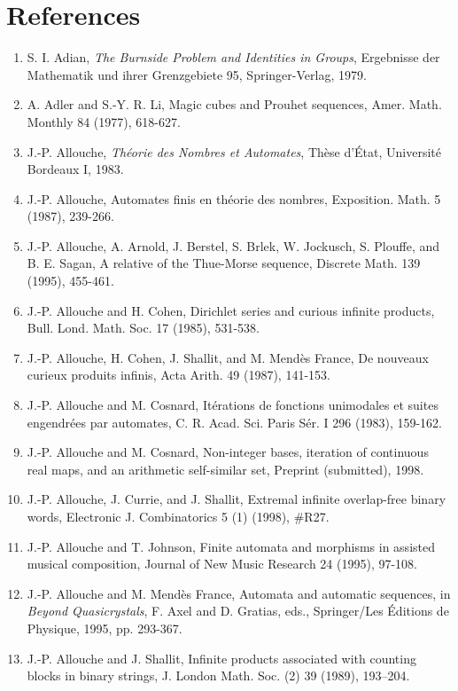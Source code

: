 \documentclass[10pt]{article}
\begin{document}
\section*{References}
\begin{enumerate}
  \item S. I. Adian, \emph{The Burnside Problem and Identities in Groups}, Ergebnisse der Mathematik und ihrer Grenzgebiete 95, Springer-Verlag, 1979.
  \item A. Adler and S.-Y. R. Li, Magic cubes and Prouhet sequences, Amer. Math. Monthly 84 (1977), 618-627.
  \item J.-P. Allouche, \emph{Théorie des Nombres et Automates}, Thèse d'État, Université Bordeaux I, 1983.
  \item J.-P. Allouche, Automates finis en théorie des nombres, Exposition. Math. 5 (1987), 239-266.
  \item J.-P. Allouche, A. Arnold, J. Berstel, S. Brlek, W. Jockusch, S. Plouffe, and B. E. Sagan, A relative of the Thue-Morse sequence, Discrete Math. 139 (1995), 455-461.
  \item J.-P. Allouche and H. Cohen, Dirichlet series and curious infinite products, Bull. Lond. Math. Soc. 17 (1985), 531-538.
  \item J.-P. Allouche, H. Cohen, J. Shallit, and M. Mendès France, De nouveaux curieux produits infinis, Acta Arith. 49 (1987), 141-153.
  \item J.-P. Allouche and M. Cosnard, Itérations de fonctions unimodales et suites engendrées par automates, C. R. Acad. Sci. Paris Sér. I 296 (1983), 159-162.
  \item J.-P. Allouche and M. Cosnard, Non-integer bases, iteration of continuous real maps, and an arithmetic self-similar set, Preprint (submitted), 1998.
  \item J.-P. Allouche, J. Currie, and J. Shallit, Extremal infinite overlap-free binary words, Electronic J. Combinatorics 5 (1) (1998), \#R27.
  \item J.-P. Allouche and T. Johnson, Finite automata and morphisms in assisted musical composition, Journal of New Music Research 24 (1995), 97-108.
  \item J.-P. Allouche and M. Mendès France, Automata and automatic sequences, in \emph{Beyond Quasicrystals}, F. Axel and D. Gratias, eds., Springer/Les Éditions de Physique, 1995, pp. 293-367.
  \item J.-P. Allouche and J. Shallit, Infinite products associated with counting blocks in binary strings, J. London Math. Soc. (2) 39 (1989), 193--204.

\end{enumerate}
\end{document}

